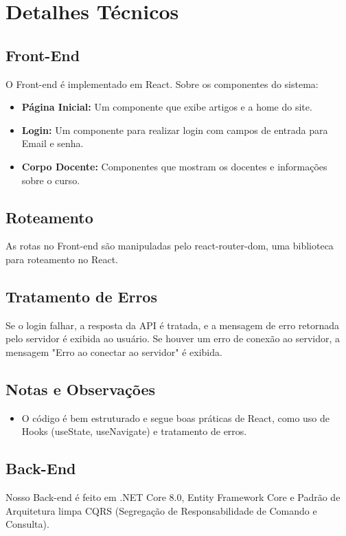 \documentclass[a4paper,12pt]{report}
\begin{document}
\section{Detalhes Técnicos}
\subsection{Front-End} 
O Front-end é implementado em React. 
Sobre os componentes do sistema: 
\begin{itemize} 
    \item \textbf{Página Inicial:} Um componente que exibe artigos e a home do site. 
    \item \textbf{Login:} Um componente para realizar login com campos de entrada para Email e senha. 
    \item \textbf{Corpo Docente:} Componentes que mostram os docentes e informações sobre o curso. 
\end{itemize}

\subsection{Roteamento} 
As rotas no Front-end são manipuladas pelo react-router-dom, uma biblioteca para roteamento no React. 

\subsection{Tratamento de Erros} 
Se o login falhar, a resposta da API é tratada, e a mensagem de erro retornada pelo servidor é exibida ao usuário. Se houver um erro de conexão ao servidor, a mensagem "Erro ao conectar ao servidor" é exibida. 

\subsection{Notas e Observações} 
\begin{itemize} 
    \item O código é bem estruturado e segue boas práticas de React, como uso de Hooks (useState, useNavigate) e tratamento de erros. 
\end{itemize} 

\subsection{Back-End} 
Nosso Back-end é feito em .NET Core 8.0, Entity Framework Core e Padrão de Arquitetura limpa CQRS (Segregação de Responsabilidade de Comando e Consulta).
  
\end{document}
